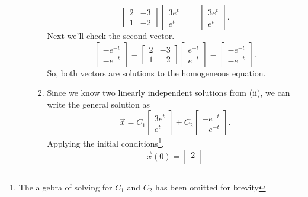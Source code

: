 \begin{enumerate}[label=\arabic*.]
\begin{enumerate}[label=(\alph*)]
\begin{enumerate}[label=(\roman*)]
\begin{equation*}
\begin{bmatrix}
									2 & -3 \\
									1 & -2
								\end{bmatrix} \begin{bmatrix}
									3e^t \\
									e^t
								\end{bmatrix} = \begin{bmatrix}
									3e^t \\
									e^t
								\end{bmatrix}.
							\end{equation*}
							Next we'll check the second vector.
							\begin{equation*}
								\begin{bmatrix}
									-e^{-t} \\
									-e^{-t}
								\end{bmatrix} = \begin{bmatrix}
									2 & -3 \\
									1 & -2
								\end{bmatrix} \begin{bmatrix}
									e^{-t} \\
									e^{-t}
								\end{bmatrix} = \begin{bmatrix}
									-e^{-t} \\
									-e^{-t}
								\end{bmatrix}.
							\end{equation*}
							So, both vectors are solutions to the homogeneous equation.
						\item
							Since we know two linearly independent solutions from (ii), we can write the general solution as
							\begin{equation*}
								\vec{x} = C_1 \begin{bmatrix}
									3e^t \\
									e^t
								\end{bmatrix} + C_2 \begin{bmatrix}
									-e^{-t} \\
									-e^{-t}
								\end{bmatrix}.
							\end{equation*}
							Applying the initial conditions\footnote{The algebra of solving for $C_1$ and $C_2$ has been omitted for brevity},
							\begin{equation*}
								\vec{x}(0) = \begin{bmatrix}
									2 \\

\end{bmatrix}
\end{equation*}
\end{enumerate}
\end{enumerate}
\end{enumerate}
